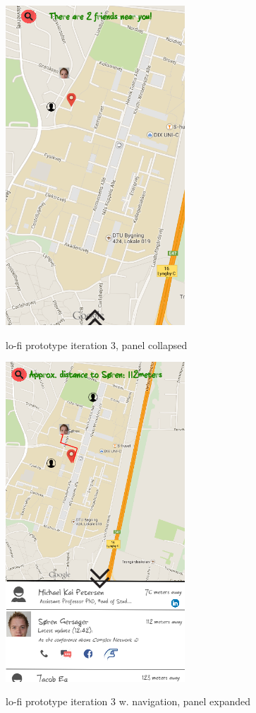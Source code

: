 \documentclass[runningheads,a4paper]{llncs}
\begin{document}
\begin{figure}
\centering
\caption{lo-fi prototype iteration 3, panel collapsed}
\includegraphics[width=0.6\textwidth]{figures/lo-fi-2}
\label{fig:lo-fi-panel-collapsed}
\end{figure}

\begin{figure}
\centering
\caption{lo-fi prototype iteration 3 w. navigation, panel expanded}
\includegraphics[width=0.6\textwidth]{figures/lo-fi-1}
\label{fig:lo-fi-w.navigation}
\end{figure}
\end{document}
